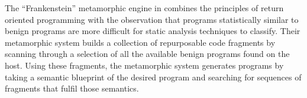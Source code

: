     The ``Frankenstein'' metamorphic engine in \cite{franken} combines the
    principles of return oriented programming with the observation that programs
    statistically similar to benign programs are more difficult for static
    analysis techniques to classify. Their metamorphic system builds a
    collection of repurposable code fragments by scanning through a selection of
    all the available benign programs found on the host. Using these fragments,
    the metamorphic system generates programs by taking a semantic blueprint of
    the desired program and searching for sequences of fragments that fulfil
    those semantics.

